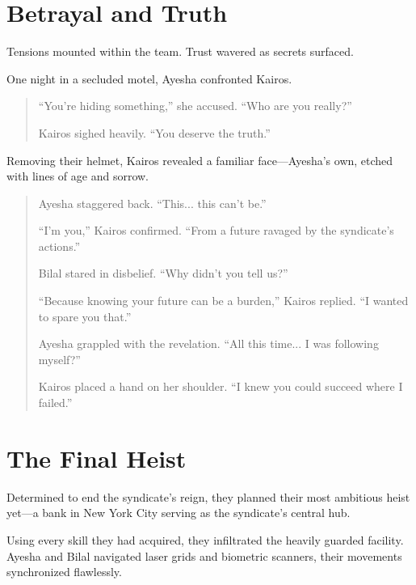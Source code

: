 \documentclass[12pt]{book}
\begin{document}
\chapter{Betrayal and Truth}

Tensions mounted within the team. Trust wavered as secrets surfaced.

One night in a secluded motel, Ayesha confronted Kairos.

\begin{quote}
    ``You're hiding something,'' she accused. ``Who are you really?''

    Kairos sighed heavily. ``You deserve the truth.''
\end{quote}

Removing their helmet, Kairos revealed a familiar face—Ayesha's own, etched with lines of age and sorrow.

\begin{quote}
    Ayesha staggered back. ``This... this can't be.''

    ``I'm you,'' Kairos confirmed. ``From a future ravaged by the syndicate's actions.''

    Bilal stared in disbelief. ``Why didn't you tell us?''

    ``Because knowing your future can be a burden,'' Kairos replied. ``I wanted to spare you that.''

    Ayesha grappled with the revelation. ``All this time... I was following myself?''

    Kairos placed a hand on her shoulder. ``I knew you could succeed where I failed.''
\end{quote}

\chapter{The Final Heist}

Determined to end the syndicate's reign, they planned their most ambitious heist yet—a bank in New York City serving as the syndicate's central hub.

Using every skill they had acquired, they infiltrated the heavily guarded facility. Ayesha and Bilal navigated laser grids and biometric scanners, their movements synchronized flawlessly.
\end{document}
